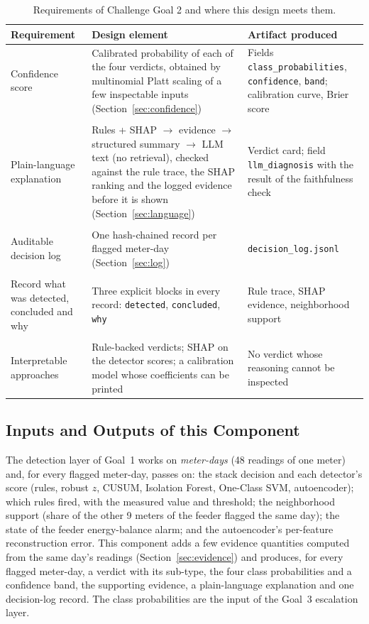 \documentclass[11pt,a4paper]{article}
\begin{document}
\begin{table}[H]
\centering
\small
\begin{tabularx}{\textwidth}{@{}>{\raggedright\arraybackslash}p{3.4cm}LL@{}}
\toprule
\textbf{Requirement} & \textbf{Design element} & \textbf{Artifact produced} \\
\midrule
Confidence score & Calibrated probability of each of the four verdicts, obtained by multinomial Platt scaling of a few inspectable inputs (Section~\ref{sec:confidence}) & Fields \texttt{class\_probabilities}, \texttt{confidence}, \texttt{band}; calibration curve, Brier score \\ \\
Plain-language explanation & Rules + SHAP $\rightarrow$ evidence $\rightarrow$ structured summary $\rightarrow$ LLM text (no retrieval), checked against the rule trace, the SHAP ranking and the logged evidence before it is shown (Section~\ref{sec:language}) & Verdict card; field \texttt{llm\_diagnosis} with the result of the faithfulness check \\ \\
Auditable decision log & One hash-chained record per flagged meter-day (Section~\ref{sec:log}) & \texttt{decision\_log.jsonl} \\ \\
Record what was detected, concluded and why & Three explicit blocks in every record: \texttt{detected}, \texttt{concluded}, \texttt{why} & Rule trace, SHAP evidence, neighborhood support \\ \\
Interpretable approaches & Rule-backed verdicts; SHAP on the detector scores; a calibration model whose coefficients can be printed & No verdict whose reasoning cannot be inspected \\
\bottomrule
\end{tabularx}
\caption{Requirements of Challenge Goal 2 and where this design meets them.}
\label{tab:requirements}
\end{table}

\subsection{Inputs and Outputs of this Component}
\label{sec:io}
The detection layer of Goal~1 works on \emph{meter-days} (48 readings of one meter) and, for every flagged
meter-day, passes on: the stack decision and each detector's score (rules, robust $z$, CUSUM, Isolation
Forest, One-Class SVM, autoencoder); which rules fired, with the measured value and threshold; the
neighborhood support (share of the other 9 meters of the feeder flagged the same day); the state of the
feeder energy-balance alarm; and the autoencoder's per-feature reconstruction error. This component adds a
few evidence quantities computed from the same day's readings (Section~\ref{sec:evidence}) and produces, for
every flagged meter-day, a verdict with its sub-type, the four class probabilities and a confidence band, the
supporting evidence, a plain-language explanation and one decision-log record. The class probabilities are
the input of the Goal~3 escalation layer.
\end{document}
